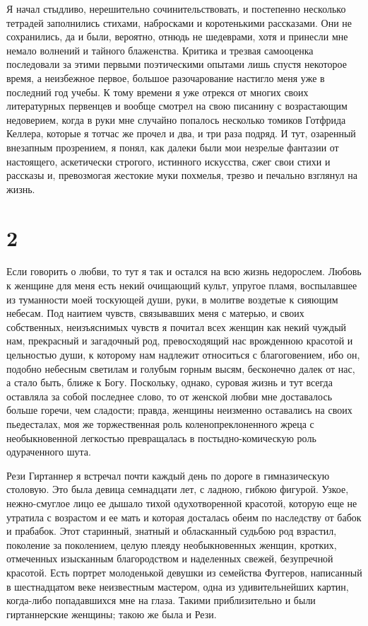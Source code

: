 Я  начал  стыдливо,   нерешительно  сочинительствовать,  и  постепенно
несколько  тетрадей  заполнились  стихами, набросками  и  коротенькими
рассказами.  Они  не  сохранились,  да и  были,  вероятно,  отнюдь  не
шедеврами, хотя и  принесли мне немало волнений  и тайного блаженства.
Критика и трезвая самооценка последовали за этими первыми поэтическими
опытами  лишь спустя  некоторое  время, а  неизбежное первое,  большое
разочарование настигло меня уже в  последний год учебы. К тому времени
я  уже  отрекся  от  многих  своих  литературных  первенцев  и  вообще
смотрел на свою  писанину с возрастающим недоверием, когда  в руки мне
случайно попалось несколько томиков Готфрида Келлера, которые я тотчас
же  прочел и  два,  и  три раза  подряд.  И  тут, озаренный  внезапным
прозрением,  я  понял,  как  далеки  были  мои  незрелые  фантазии  от
настоящего, аскетически строгого, истинного искусства, сжег свои стихи
и рассказы  и, превозмогая жестокие  муки похмелья, трезво  и печально
взглянул на жизнь.


\section*{2}


Если  говорить  о  любви,  то  тут  я  так  и  остался  на  всю  жизнь
недорослем.  Любовь к  женщине для  меня есть  некий очищающий  культ,
упругое  пламя,   воспылавшее  из  туманности  моей   тоскующей  души,
руки,  в  молитве воздетые  к  сияющим  небесам. Под  наитием  чувств,
связывавших меня с матерью, и своих собственных, неизъяснимых чувств я
почитал  всех женщин  как некий  чуждый нам,  прекрасный и  загадочный
род,  превосходящий  нас  врожденною  красотой и  цельностью  души,  к
которому  нам надлежит  относиться  с благоговением,  ибо он,  подобно
небесным светилам  и голубым  горным высям,  бесконечно далек  от нас,
а  стало  быть, ближе  к  Богу.  Поскольку,  однако, суровая  жизнь  и
тут  всегда  оставляла  за  собой   последнее  слово,  то  от  женской
любви  мне доставалось  больше горечи,  чем сладости;  правда, женщины
неизменно оставались  на своих пьедесталах, моя  же торжественная роль
коленопреклоненного  жреца с  необыкновенной легкостью  превращалась в
постыдно-комическую роль одураченного шута.

Рези Гиртаннер я встречал почти  каждый день по дороге в гимназическую
столовую. Это  была девица семнадцати  лет, с ладною,  гибкою фигурой.
Узкое,  нежно-смуглое лицо  ее дышало  тихой одухотворенной  красотой,
которую еще  не утратила  с возрастом  и ее  мать и  которая досталась
обеим  по наследству  от  бабок и  прабабок.  Этот старинный,  знатный
и  обласканный   судьбою  род   взрастил,  поколение   за  поколением,
целую  плеяду необыкновенных  женщин,  кротких, отмеченных  изысканным
благородством и наделенных свежей,  безупречной красотой. Есть портрет
молоденькой девушки  из семейства Фуггеров, написанный  в шестнадцатом
веке неизвестным мастером, одна  из удивительнейших картин, когда-либо
попадавшихся мне на глаза.  Такими приблизительно и были гиртаннерские
женщины; такою же была и Рези.

